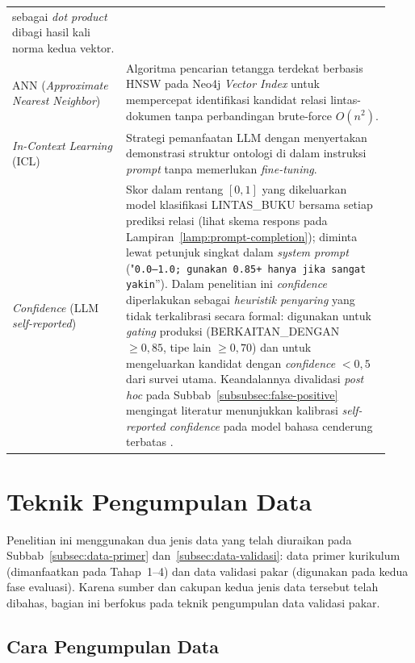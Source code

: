 \documentclass[main]{subfiles}
\begin{document}
\begin{longtable}{@{}p{0.28\linewidth}p{0.65\linewidth}@{}}
      sebagai \textit{dot product} dibagi hasil kali norma kedua vektor.\\
  ANN (\textit{Approximate Nearest Neighbor})
    & Algoritma pencarian tetangga terdekat berbasis HNSW pada Neo4j
      \textit{Vector Index} untuk mempercepat identifikasi kandidat
      relasi lintas-dokumen tanpa perbandingan brute-force
      $O(n^2)$. \\
  \textit{In-Context Learning} (ICL)
    & Strategi pemanfaatan LLM dengan menyertakan demonstrasi struktur
      ontologi di dalam instruksi \textit{prompt} tanpa memerlukan
      \textit{fine-tuning}. \\
  \textit{Confidence} (LLM \textit{self-reported})
    & Skor dalam rentang $[0,1]$ yang dikeluarkan model klasifikasi
      LINTAS\_BUKU bersama setiap prediksi relasi (lihat skema respons
      pada Lampiran~\ref{lamp:prompt-completion}); diminta lewat
      petunjuk singkat dalam \textit{system prompt} ("\texttt{0.0--1.0;
      gunakan 0.85+ hanya jika sangat yakin}''). Dalam penelitian ini
      \textit{confidence} diperlakukan sebagai \textit{heuristik
      penyaring} yang tidak terkalibrasi secara formal: digunakan untuk
      \textit{gating} produksi (BERKAITAN\_DENGAN $\geq 0{,}85$, tipe
      lain $\geq 0{,}70$) dan untuk mengeluarkan kandidat dengan
      \textit{confidence} $< 0{,}5$ dari survei utama. Keandalannya
      divalidasi \textit{post hoc} pada
      Subbab~\ref{subsubsec:false-positive} mengingat literatur
      menunjukkan kalibrasi \textit{self-reported confidence} pada model
      bahasa cenderung terbatas \parencite{kadavath_language_2022}. \\
\end{longtable}

\section{Teknik Pengumpulan Data}

Penelitian ini menggunakan dua jenis data yang telah diuraikan pada
Subbab~\ref{subsec:data-primer} dan~\ref{subsec:data-validasi}: data primer
kurikulum (dimanfaatkan pada Tahap~1--4) dan data validasi pakar (digunakan
pada kedua fase evaluasi). Karena sumber dan cakupan kedua jenis data tersebut
telah dibahas, bagian ini berfokus pada teknik pengumpulan data validasi pakar.

\subsection{Cara Pengumpulan Data}\label{subsec:cara-pengumpulan}
\end{document}
